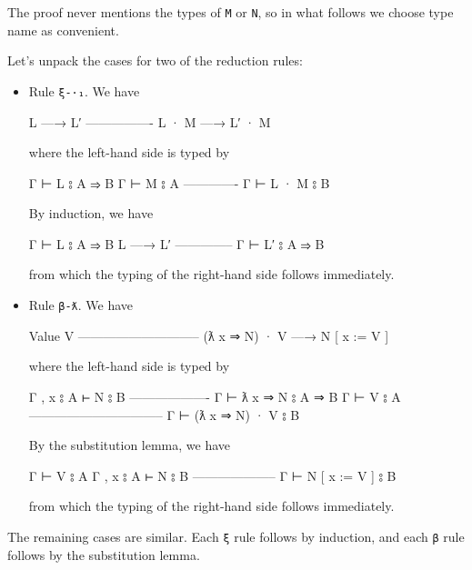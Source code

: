 The proof never mentions the types of \texttt{M} or \texttt{N}, so in
what follows we choose type name as convenient.

Let's unpack the cases for two of the reduction rules:

\begin{itemize}
\item
  Rule \texttt{ξ-·₁}. We have

  \begin{myDisplay}
  L —→ L′
  ----------------
  L · M —→ L′ · M
  \end{myDisplay}

  where the left-hand side is typed by

  \begin{myDisplay}
  Γ ⊢ L ⦂ A ⇒ B
  Γ ⊢ M ⦂ A
  -------------
  Γ ⊢ L · M ⦂ B
  \end{myDisplay}

  By induction, we have

  \begin{myDisplay}
  Γ ⊢ L ⦂ A ⇒ B
  L —→ L′
  --------------
  Γ ⊢ L′ ⦂ A ⇒ B
  \end{myDisplay}

  from which the typing of the right-hand side follows immediately.
\item
  Rule \texttt{β-ƛ}. We have

  \begin{myDisplay}
  Value V
  -----------------------------
  (ƛ x ⇒ N) · V —→ N [ x := V ]
  \end{myDisplay}

  where the left-hand side is typed by

  \begin{myDisplay}
  Γ , x ⦂ A ⊢ N ⦂ B
  -------------------
  Γ ⊢ ƛ x ⇒ N ⦂ A ⇒ B    Γ ⊢ V ⦂ A
  --------------------------------
  Γ ⊢ (ƛ x ⇒ N) · V ⦂ B
  \end{myDisplay}

  By the substitution lemma, we have

  \begin{myDisplay}
  Γ ⊢ V ⦂ A
  Γ , x ⦂ A ⊢ N ⦂ B
  --------------------
  Γ ⊢ N [ x := V ] ⦂ B
  \end{myDisplay}

  from which the typing of the right-hand side follows immediately.
\end{itemize}

The remaining cases are similar. Each \texttt{ξ} rule follows by
induction, and each \texttt{β} rule follows by the substitution lemma.

